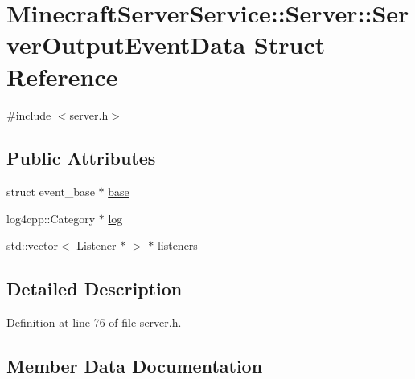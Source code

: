 \hypertarget{struct_minecraft_server_service_1_1_server_1_1_server_output_event_data}{}\section{Minecraft\+Server\+Service\+:\+:Server\+:\+:Server\+Output\+Event\+Data Struct Reference}
\label{struct_minecraft_server_service_1_1_server_1_1_server_output_event_data}


{\ttfamily \#include $<$server.\+h$>$}

\subsection*{Public Attributes}
\begin{DoxyCompactItemize}
\item 
struct event\+\_\+base $\ast$ \hyperlink{struct_minecraft_server_service_1_1_server_1_1_server_output_event_data_a0c622aed801f6df81751e94a0f962c28}{base}
\item 
log4cpp\+::\+Category $\ast$ \hyperlink{struct_minecraft_server_service_1_1_server_1_1_server_output_event_data_a271ef29168235bf1004a7e394acbb282}{log}
\item 
std\+::vector$<$ \hyperlink{struct_minecraft_server_service_1_1_server_1_1_listener}{Listener} $\ast$ $>$ $\ast$ \hyperlink{struct_minecraft_server_service_1_1_server_1_1_server_output_event_data_a761ef24355fe5f38b8aac5dea973c76a}{listeners}
\end{DoxyCompactItemize}


\subsection{Detailed Description}


Definition at line 76 of file server.\+h.



\subsection{Member Data Documentation}
